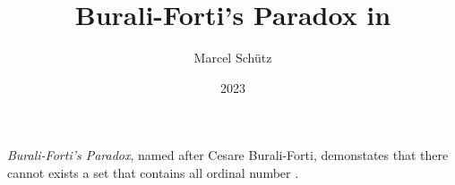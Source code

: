 \documentclass{stex}
\title{Burali-Forti's Paradox in \Naproche}
\author{Marcel Schütz}
\date{2023}
\begin{document}
\maketitle

\noindent \emph{Burali-Forti's Paradox}, named after Cesare Burali-Forti, demonstates that there cannot exists a set that contains all ordinal number \cite{BuraliForti1897}.


\printbibliography
\end{document}
